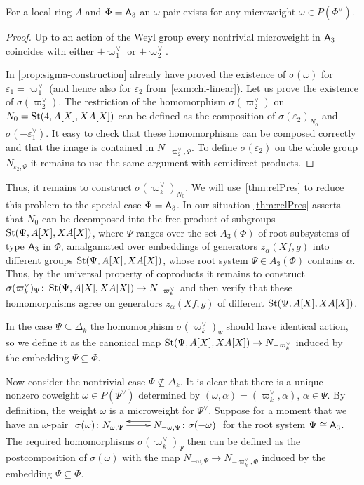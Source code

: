 \begin{cor}
    For a local ring $A$ and $\Phi = \mathsf{A}_3$ an $\omega$-pair exists for any microweight $\omega \in P(\Phi^\vee)$.
\end{cor}
\begin{proof}
    Up to an action of the Weyl group every nontrivial microweight in $\mathsf{A}_3$ coincides with either
    $\pm\varpi_1^\vee$ or $\pm\varpi_2^\vee$.

    In \cref{prop:sigma-construction} already have proved the existence of $\sigma(\omega)$ for $\varepsilon_1 = \varpi_1^\vee$ (and hence also for $\varepsilon_2$ from~\cref{exm:chi-linear}).
    Let us prove the existence of $\sigma(\varpi_2^\vee)$.
    The restriction of the homomorphism $\sigma(\varpi_2^\vee)$ on $N_0 = \operatorname{St}(4, A[X], XA[X])$ can be defined as the composition of
     $\sigma(\varepsilon_2)_{N_0}$ and $\sigma(-\varepsilon_1^\vee)$.
    It easy to check that these homomorphisms can be composed correctly and that the image is contained in $N_{-\varpi_2^\vee, \Psi}$.
    To define $\sigma(\varepsilon_2)$ on the whole group $N_{\varepsilon_2, \Psi}$ it remains to use the same argument with semidirect products.
\end{proof}

Thus, it remains to construct $\sigma({\varpi_k^\vee})_{N_0}$.
We will use~\cref{thm:relPres} to reduce this problem to the special case $\Phi = \mathsf{A}_3$.
In our situation \cref{thm:relPres} asserts that $N_0$ can be decomposed into the free product of subgroups $\operatorname{St}(\Psi, A[X], XA[X])$,
 where $\Psi$ ranges over the set $A_3(\Phi)$ of root subsystems of type $\mathsf{A}_3$ in $\Phi$, amalgamated over embeddings of generators $z_\alpha(Xf, g)$ into different groups $\operatorname{St}(\Psi, A[X], XA[X])$, whose root system $\Psi \in A_3(\Phi)$ contains $\alpha$.
Thus, by the universal property of coproducts it remains to construct $\sigma(\varpi_k^\vee)_\Psi \colon \operatorname{St}(\Psi, A[X], XA[X]) \to N_{-\varpi_k^\vee}$ and then
  verify that these homomorphisms agree on generators $z_\alpha(Xf, g)$ of different $\operatorname{St}(\Psi, A[X], XA[X])$.

In the case $\Psi \subseteq \Delta_k$ the homomorphism $\sigma(\varpi_k^\vee)_\Psi$ should have identical action, so we define it as the canonical map $\operatorname{St}(\Psi, A[X], XA[X]) \to N_{-\varpi_k^\vee}$
induced by the embedding $\Psi \subseteq \Phi$.

Now consider the nontrivial case $\Psi \not\subseteq \Delta_k$.
It is clear that there is a unique nonzero coweight $\omega \in P(\Psi^\vee)$ determined by $(\omega, \alpha) = (\varpi_k^\vee, \alpha)$, $\alpha \in \Psi$.
By definition, the weight $\omega$ is a microweight for $\Psi^\vee$.
Suppose for a moment that we have an $\omega$-pair $\xymatrix{ \sigma(\omega)\colon N_{\omega, \Psi} \ar[r] & \ar@<-1.0ex>[l] N_{-\omega, \Psi}\colon \sigma(-\omega) }$ for the root system $\Psi\cong \mathsf{A}_3$.
The required homomorphisms $\sigma(\varpi_k^\vee)_\Psi$ then can be defined as the postcomposition of $\sigma(\omega)$ with the map $N_{-\omega, \Psi} \to N_{-\varpi_k^\vee, \Phi}$ induced by the embedding $\Psi \subseteq \Phi$.

